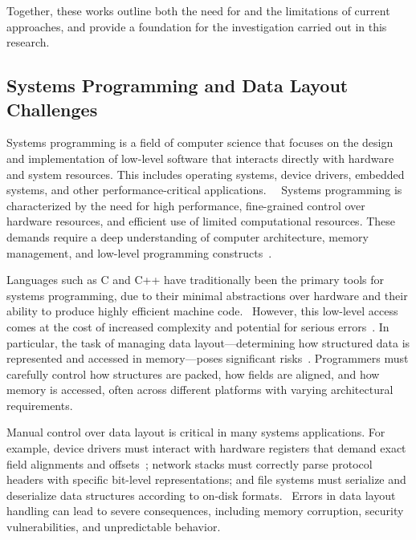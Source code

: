 \documentclass[12pt]{article}
\begin{document}
Together, these works outline both the need for and the limitations of current
approaches, and provide a foundation for the investigation carried out in this
research.

\subsection{Systems Programming and Data Layout Challenges}
Systems programming is a field of computer science that focuses
on the design and implementation of low-level software that interacts 
directly with hardware and system resources. This includes operating
systems, device drivers, embedded systems, and other performance-critical
applications.~\autocite{C_errors_study}~\autocite{network_memory_layouts}
Systems programming is characterized by the need for
high performance, fine-grained control over hardware resources, and efficient use
of limited computational resources. These demands require a deep understanding of
computer architecture, memory management, and low-level programming
constructs~\autocite{C_union_bugs}.


Languages such as C and C++ have traditionally been the primary tools for
systems programming, due to their minimal abstractions over hardware and their
ability to produce highly efficient machine code.~\autocite{C_embedded_programming}
However, this low-level access comes at the
cost of increased complexity and potential for serious errors~\autocite{C_errors_study}. In particular, 
the task of managing data layout---determining how structured data is
represented and accessed in memory---poses significant risks~\autocite{data_layout}. Programmers must
carefully control how structures are packed, how fields are aligned, and how
memory is accessed, often across different platforms with varying architectural
requirements.

Manual control over data layout is critical in many systems applications. For
example, device drivers must interact with hardware registers that demand exact
field alignments and offsets~\autocite{device_drivers};
network stacks must correctly parse protocol~\autocite{network_memory_layouts}
headers with specific bit-level representations; and file systems must
serialize and deserialize data structures according to on-disk formats.~\autocite{file_systems}
Errors
in data layout handling can lead to severe consequences, including memory
corruption, security vulnerabilities, and unpredictable 
behavior\autocite{memory_errors_stridharan,memory_bottleneck,evaluation_memory_errors}.
\end{document}
